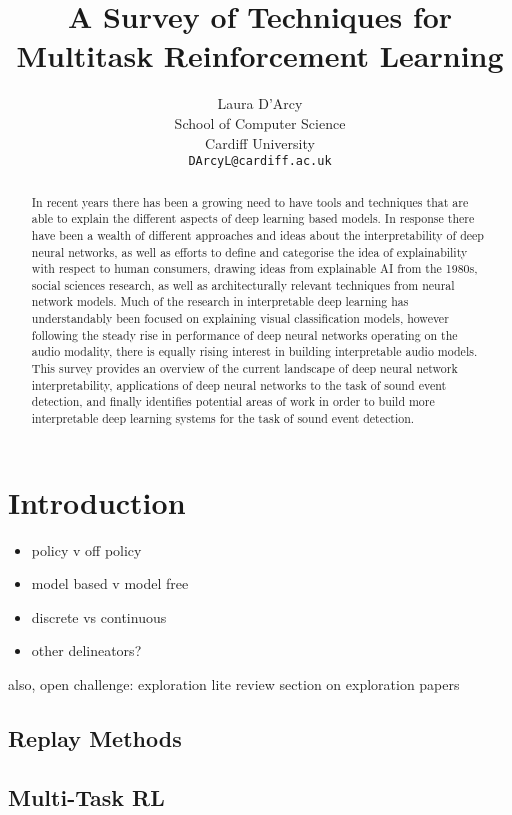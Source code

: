 \documentclass{article}
\title{A Survey of Techniques for Multitask Reinforcement Learning}
\date{} 					%
\author{
  Laura D'Arcy\\
  School of Computer Science\\
  Cardiff University\\
  \texttt{DArcyL@cardiff.ac.uk}}
\begin{document}
\maketitle

\begin{abstract}
  In recent years there has been a growing need to have tools and techniques that are able to explain the different aspects of deep learning based models. In response there have been a wealth of different approaches and ideas about the interpretability of deep neural networks, as well as efforts to define and categorise the idea of explainability with respect to human consumers, drawing ideas from explainable AI from the 1980s, social sciences research, as well as architecturally relevant techniques from neural network models. Much of the research in interpretable deep learning has understandably been focused on explaining visual classification models, however following the steady rise in performance of deep neural networks operating on the audio modality, there is equally rising interest in building interpretable audio models.
  This survey provides an overview of the current landscape of deep neural network interpretability, applications of deep neural networks to the task of sound event detection, and finally identifies potential areas of work in order to build more interpretable deep learning systems for the task of sound event detection.
\end{abstract}

\vfill
\tableofcontents 
\newpage



\section{Introduction}

\begin{itemize}
    \item policy v off policy
    \item model based v model free
    \item discrete vs continuous
    \item other delineators?
\end{itemize}
also, open challenge: exploration
lite review section on exploration papers
\subsection{Replay Methods}\label{section:RL_Graphs}

\subsection{Multi-Task RL}\label{section:RL_Complex}
\end{document}
